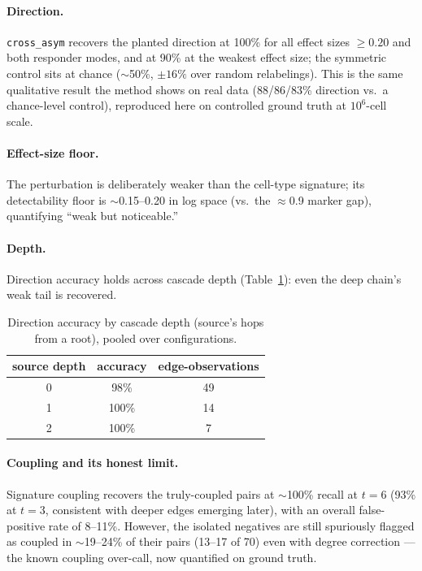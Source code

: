\documentclass[11pt,a4paper]{article}
\begin{document}
\paragraph{Direction.} \texttt{cross\_asym} recovers the planted direction at 100\% for all
effect sizes $\ge0.20$ and both responder modes, and at 90\% at the weakest effect size; the
symmetric control sits at chance ($\sim$50\%, $\pm16\%$ over random relabelings). This is the
same qualitative result the method shows on real data (88/86/83\% direction vs.\ a
chance-level control), reproduced here on controlled ground truth at $10^6$-cell scale.

\paragraph{Effect-size floor.} The perturbation is deliberately weaker than the cell-type
signature; its detectability floor is $\sim$0.15--0.20 in log space (vs.\ the $\approx$0.9
marker gap), quantifying ``weak but noticeable.''

\paragraph{Depth.} Direction accuracy holds across cascade depth (Table~\ref{tab:depth}):
even the deep chain's weak tail is recovered.

\begin{table}[h]
\centering
\caption{Direction accuracy by cascade depth (source's hops from a root), pooled over
configurations.}
\label{tab:depth}
\begin{tabular}{@{}ccc@{}}
\toprule
source depth & accuracy & edge-observations \\
\midrule
0 & 98\%  & 49 \\
1 & 100\% & 14 \\
2 & 100\% & 7 \\
\bottomrule
\end{tabular}
\end{table}

\paragraph{Coupling and its honest limit.} Signature coupling recovers the truly-coupled
pairs at $\sim$100\% recall at $t\!=\!6$ (93\% at $t\!=\!3$, consistent with deeper edges
emerging later), with an overall false-positive rate of 8--11\%. However, the isolated
negatives are still spuriously flagged as coupled in $\sim$19--24\% of their pairs
(13--17 of 70) even with degree correction --- the known coupling over-call, now quantified
on ground truth.
\end{document}
